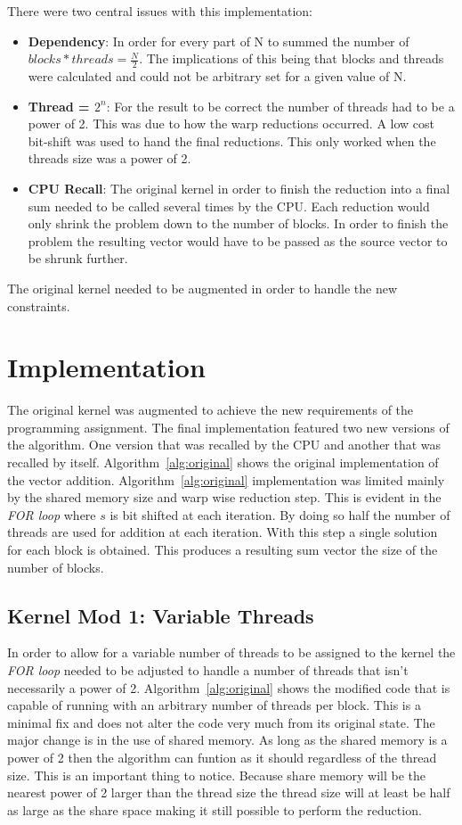 \documentclass[conference]{IEEEtran}
\begin{document}
There were two central issues with this implementation:
\begin{itemize}
  \item \textbf{Dependency}: In order for every part of N to summed the number of $blocks*threads=\frac{N}{2}$. The implications of this being that blocks and threads were calculated and could not be arbitrary set for a given value of N.
  \item \textbf{Thread = $2^n$}: For the result to be correct the number of threads had to be a power of 2. This was due to how the warp reductions occurred. A low cost bit-shift was used to hand the final reductions. This only worked when the threads size was a power of 2.
  \item \textbf{CPU Recall}: The original kernel in order to finish the reduction into a final sum needed to be called several times by the CPU. Each reduction would only shrink the problem down to the number of blocks. In order to finish the problem the resulting vector would have to be passed as the source vector to be shrunk further.
\end{itemize}

The original kernel needed to be augmented in order to handle the new constraints.
\section{Implementation}
The original kernel was augmented to achieve the new requirements of the programming assignment. The final implementation featured two new versions of the algorithm. One version that was recalled by the CPU and another that was recalled by itself. Algorithm~\ref{alg:original} shows the original implementation of the vector addition. Algorithm~\ref{alg:original} implementation was limited mainly by the shared memory size and warp wise reduction step. This is evident in the \emph{FOR loop} where $s$ is bit shifted at each iteration. By doing so half the number of threads are used for addition at each iteration. With this step a single solution for each block is obtained. This produces a resulting sum vector the size of the number of blocks.

\subsection{Kernel Mod 1: Variable Threads}
In order to allow for a variable number of threads to be assigned to the kernel the \emph{FOR loop} needed to be adjusted to handle a number of threads that isn't necessarily a power of 2. Algorithm~\ref{alg:original} shows the modified code that is capable of running with an arbitrary number of threads per block. This is a minimal fix and does not alter the code very much from its original state. The major change is in the use of shared memory. As long as the shared memory is a power of 2 then the algorithm can funtion as it should regardless of the thread size. This is an important thing to notice. Because share memory will be the nearest power of 2 larger than the thread size the thread size will at least be half as large as the share space making it still possible to perform the reduction.
\end{document}
